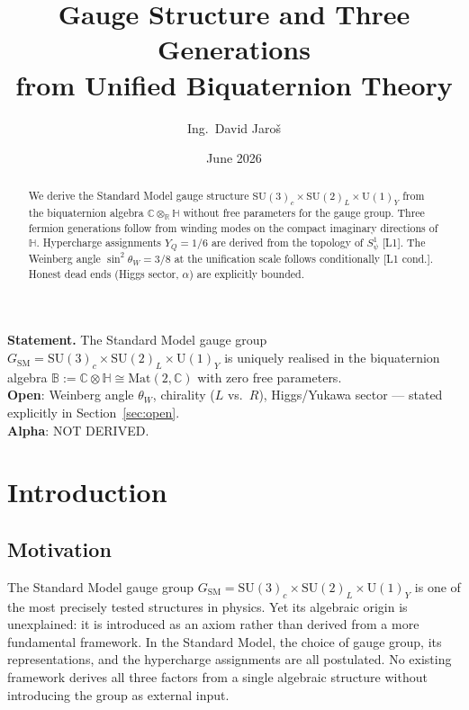 \documentclass[12pt,a4paper]{article}
\title{\textbf{Gauge Structure and Three Generations\\
               from Unified Biquaternion Theory}}
\author{Ing.\ David Jaroš}
\date{June 2026}
\theoremstyle{definition}
\theoremstyle{remark}
\newcommand{\SU}[1]{\mathrm{SU}(#1)}
\newcommand{\UU}[1]{\mathrm{U}(#1)}
\newcommand{\Bq}{\mathbb{C}\otimes\mathbb{H}}
\begin{document}
\maketitle


\begin{tcolorbox}[enhanced,colback=blue!4!white,colframe=blue!55!black,
  arc=3pt,boxrule=1.2pt,
  title={\textbf{\large Main Theorem (Gauge Structure)}}]
\textbf{Statement.}
The Standard Model gauge group
$G_{\mathrm{SM}} = \SU{3}_c\times\SU{2}_L\times\UU{1}_Y$
is uniquely realised in the biquaternion algebra
$\mathbb{B} := \Bq\cong\mathrm{Mat}(2,\mathbb{C})$
with zero free parameters.\\[4pt]
\textbf{Open}: Weinberg angle $\theta_W$, chirality ($L$ vs.\ $R$), Higgs/Yukawa sector —
stated explicitly in Section~\ref{sec:open}.\\[4pt]
\textbf{Alpha}: NOT DERIVED.
\end{tcolorbox}

\begin{abstract}
We derive the Standard Model gauge structure
$\mathrm{SU}(3)_c\times\mathrm{SU}(2)_L\times\mathrm{U}(1)_Y$
from the biquaternion algebra $\mathbb{C}\otimes_{\mathbb{R}}\mathbb{H}$
without free parameters for the gauge group.
Three fermion generations follow from winding modes on the compact
imaginary directions of $\mathbb{H}$.
Hypercharge assignments $Y_Q=1/6$ are derived from the topology of
$S^1_\psi$ [L1].
The Weinberg angle $\sin^2\theta_W = 3/8$ at the unification scale
follows conditionally [L1 cond.].
Honest dead ends (Higgs sector, $\alpha$) are
explicitly bounded.
\end{abstract}

\tableofcontents

\section{Introduction}
\label{sec:intro}

\subsection{Motivation}

The Standard Model gauge group
$G_{\mathrm{SM}} = \SU{3}_c\times\SU{2}_L\times\UU{1}_Y$
is one of the most precisely tested structures in physics.
Yet its algebraic origin is unexplained: it is introduced as an axiom
rather than derived from a more fundamental framework.
In the Standard Model, the choice of gauge group, its representations,
and the hypercharge assignments are all postulated.
No existing framework derives all three factors from a single algebraic
structure without introducing the group as external input.
\end{document}

